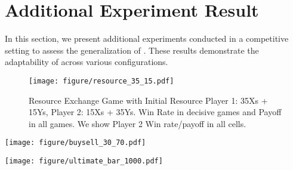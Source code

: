 \section{Additional Experiment Result}\label{ap:result}
In this section, we present additional experiments conducted in a competitive setting to assess the generalization of \model{}. These results demonstrate the adaptability of \model{} across various configurations. 
\begin{figure}[h!]
    \centering
    \texttt{[image: figure/resource\_35\_15.pdf]}
    \caption{Resource Exchange Game with Initial Resource Player 1: 35Xs + 15Ys, Player 2: 15Xs + 35Ys. Win Rate in decisive games and Payoff in all games. We show Player 2 Win rate/payoff in all cells.}
    \label{fig:resource_35_15}
\end{figure}

\begin{minipage}{0.48\textwidth}
    \centering
    \texttt{[image: figure/buysell\_30\_70.pdf]}
    \label{fig:buysell_30_70}
\end{minipage}
\hfill
\begin{minipage}{0.48\textwidth}
    \centering
    \texttt{[image: figure/ultimate\_bar\_1000.pdf]}
    \label{fig:ultimate_1000}
\end{minipage}







